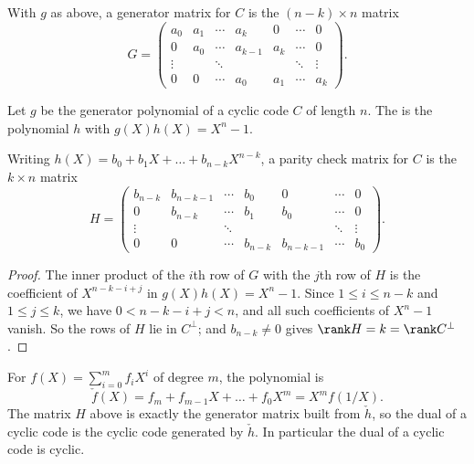 \begin{corollary}
	With $g$ as above, a generator matrix for $C$ is the $(n-k)\times n$ matrix
	$$G = \begin{pmatrix}
		a_0 & a_1 & \cdots & a_k & 0 & \cdots & 0\\
		0 & a_0 & \cdots & a_{k-1} & a_k & \cdots & 0\\
		\vdots & & \ddots & & & \ddots & \vdots\\
		0 & 0 & \cdots & a_0 & a_1 & \cdots & a_k
	\end{pmatrix}.$$
\end{corollary}

\begin{definition}
	Let $g$ be the generator polynomial of a cyclic code $C$ of length $n$. The  is the polynomial $h$ with $g(X)h(X) = X^n-1$.
\end{definition}

\begin{corollary}
	Writing $h(X) = b_0+b_1X+\dots+b_{n-k}X^{n-k}$, a parity check matrix for $C$ is the $k\times n$ matrix
	$$H = \begin{pmatrix}
		b_{n-k} & b_{n-k-1} & \cdots & b_0 & 0 & \cdots & 0\\
		0 & b_{n-k} & \cdots & b_1 & b_0 & \cdots & 0\\
		\vdots & & \ddots & & & \ddots & \vdots\\
		0 & 0 & \cdots & b_{n-k} & b_{n-k-1} & \cdots & b_0
	\end{pmatrix}.$$
\end{corollary}

\begin{proof}
	The inner product of the $i$th row of $G$ with the $j$th row of $H$ is the coefficient of $X^{n-k-i+j}$ in $g(X)h(X) = X^n-1$. Since $1 \le i \le n-k$ and $1 \le j \le k$, we have $0 < n-k-i+j< n$, and all such coefficients of $X^n-1$ vanish. So the rows of $H$ lie in $C^\perp$; and $b_{n-k}\ne0$ gives $\rank H = k = \rank C^\perp$.
\end{proof}

\begin{remark}
	For $f(X) = \sum_{i=0}^m f_iX^i$ of degree $m$, the  polynomial is
	$$\check f(X) = f_m + f_{m-1}X+\dots+f_0X^m = X^mf(1/X).$$
	The matrix $H$ above is exactly the generator matrix built from $\check h$, so the dual of a cyclic code is the cyclic code generated by $\check h$. In particular the dual of a cyclic code is cyclic.
\end{remark}

